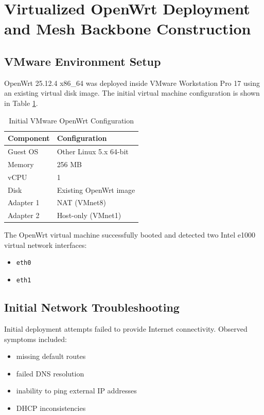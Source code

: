 \documentclass[conference]{IEEEtran}
\begin{document}
\section{Virtualized OpenWrt Deployment and Mesh Backbone Construction}

\subsection{VMware Environment Setup}

OpenWrt 25.12.4 x86\_64 was deployed inside VMware Workstation Pro 17 using an existing virtual disk image. The initial virtual machine configuration is shown in Table \ref{tab:vmconfig}.

\begin{table}[h]
\centering
\caption{Initial VMware OpenWrt Configuration}
\label{tab:vmconfig}
\begin{tabular}{|l|l|}
\hline
Component & Configuration \\ \hline
Guest OS & Other Linux 5.x 64-bit \\ \hline
Memory & 256 MB \\ \hline
vCPU & 1 \\ \hline
Disk & Existing OpenWrt image \\ \hline
Adapter 1 & NAT (VMnet8) \\ \hline
Adapter 2 & Host-only (VMnet1) \\ \hline
\end{tabular}
\end{table}

The OpenWrt virtual machine successfully booted and detected two Intel e1000 virtual network interfaces:
\begin{itemize}
    \item \texttt{eth0}
    \item \texttt{eth1}
\end{itemize}

\subsection{Initial Network Troubleshooting}

Initial deployment attempts failed to provide Internet connectivity. Observed symptoms included:

\begin{itemize}
    \item missing default routes
    \item failed DNS resolution
    \item inability to ping external IP addresses
    \item DHCP inconsistencies
\end{itemize}
\end{document}
